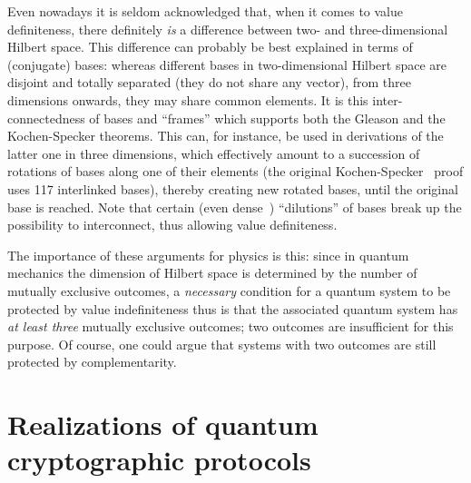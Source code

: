 \documentclass[%
 preprint,
 showpacs,
 showkeys,
 preprintnumbers,
 amsmath,amssymb,
 aps,
 pra,
  longbibliography,
 ]{revtex4-1}
\begin{document}
Even nowadays it is seldom acknowledged that,
when it comes to value definiteness, there definitely {\em is} a difference between
two- and three-dimensional Hilbert space.
This difference can probably be best explained in terms of (conjugate) bases:
whereas different bases in two-dimensional Hilbert space are disjoint and totally separated
(they do not share any vector),
from three dimensions onwards, they may share common elements.
It is this inter-connectedness of bases and ``frames'' which
supports both the Gleason and the Kochen-Specker theorems.
This can, for instance, be used in derivations of the latter one in three dimensions,
which effectively amount to a succession of rotations of bases along one of their elements
(the original Kochen-Specker~\cite{kochen1} proof uses 117 interlinked bases), thereby creating new rotated bases,
until the original base is reached.
Note that certain (even dense~\cite{meyer:99}) ``dilutions'' of bases break up the possibility to interconnect,
thus allowing value definiteness.

The importance of these arguments for physics is this:
since in quantum mechanics the dimension of Hilbert space
is determined by the number of mutually exclusive outcomes,
a {\em necessary} condition for a quantum system to be protected by value indefiniteness
thus is that the associated quantum system has {\em at least three} mutually exclusive outcomes;
two outcomes are insufficient for this purpose.
Of course, one could argue that systems with two outcomes are still protected by complementarity.

\section{Realizations of quantum cryptographic protocols}
\end{document}
